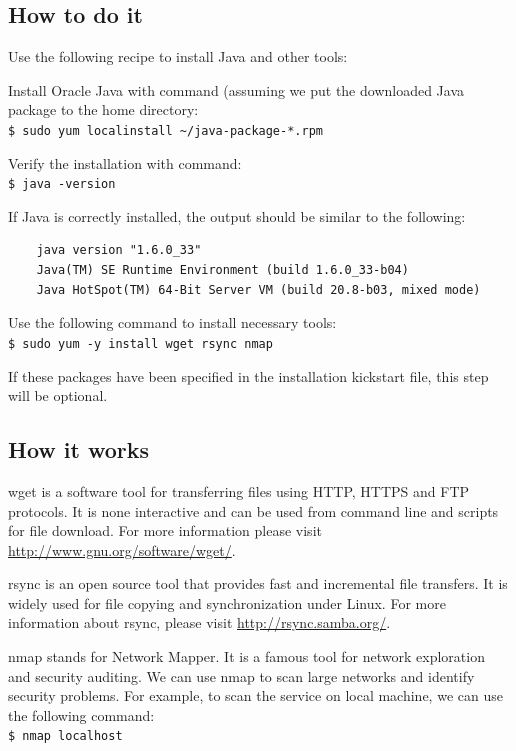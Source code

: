 \subsection*{How to do it}
Use the following recipe to install Java and other tools:

Install Oracle Java with command (assuming we put the downloaded Java package to the home directory: \\
\verb|$ sudo yum localinstall ~/java-package-*.rpm|

Verify the installation with command: \\
\verb|$ java -version|

If Java is correctly installed, the output should be similar to the following:
\begin{verbatim}
    java version "1.6.0_33"
    Java(TM) SE Runtime Environment (build 1.6.0_33-b04)
    Java HotSpot(TM) 64-Bit Server VM (build 20.8-b03, mixed mode)
\end{verbatim}

Use the following command to install necessary tools: \\
\verb|$ sudo yum -y install wget rsync nmap|

If these packages have been specified in the installation kickstart file, this step will be optional.

\subsection*{How it works}
wget\emph{} is a software tool for transferring files using HTTP, HTTPS and FTP protocols. It is none interactive and can be used from command line and scripts for file download. For more information please visit \href{http://www.gnu.org/software/wget/}{http://www.gnu.org/software/wget/}.

rsync\emph{} is an open source tool that provides fast and incremental file transfers. It is widely used for file copying and synchronization under Linux. For more information about rsync, please visit \url{http://rsync.samba.org/}.

nmap\emph{} stands for Network Mapper. It is a famous tool for network exploration and security auditing. We can use nmap to scan large networks and identify security problems. For example, to scan the service on local machine, we can use the following command:\\
\verb|$ nmap localhost|

